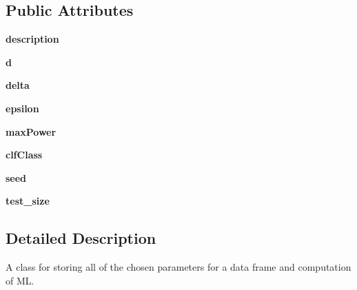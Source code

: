 \subsection*{Public Attributes}
\begin{DoxyCompactItemize}
\item 
\mbox{\label{classteaspoon_1_1_m_l_1_1tents_1_1_parameter_bucket_aab5e7cf19dc8d00b44243586dc157ae5}} 
{\bfseries description}
\item 
\mbox{\label{classteaspoon_1_1_m_l_1_1tents_1_1_parameter_bucket_aa69a9219e71bf7677b778ab688a82722}} 
{\bfseries d}
\item 
\mbox{\label{classteaspoon_1_1_m_l_1_1tents_1_1_parameter_bucket_a364570816d395fe5e3e13fc4eb9f2bcc}} 
{\bfseries delta}
\item 
\mbox{\label{classteaspoon_1_1_m_l_1_1tents_1_1_parameter_bucket_aee2cf8f4bd0d697511d23927be6531fa}} 
{\bfseries epsilon}
\item 
\mbox{\label{classteaspoon_1_1_m_l_1_1tents_1_1_parameter_bucket_a40d7ea4c52a9b9751903c8c392233370}} 
{\bfseries max\+Power}
\item 
\mbox{\label{classteaspoon_1_1_m_l_1_1tents_1_1_parameter_bucket_a2c0528cb4de976390b1c6495e3a43050}} 
{\bfseries clf\+Class}
\item 
\mbox{\label{classteaspoon_1_1_m_l_1_1tents_1_1_parameter_bucket_a0da392dadd9c38cf0fd09fae278aee35}} 
{\bfseries seed}
\item 
\mbox{\label{classteaspoon_1_1_m_l_1_1tents_1_1_parameter_bucket_a6702b903295c0a0e86888783b3273972}} 
{\bfseries test\+\_\+size}
\end{DoxyCompactItemize}


\subsection{Detailed Description}
A class for storing all of the chosen parameters for a data frame and computation of ML. 

